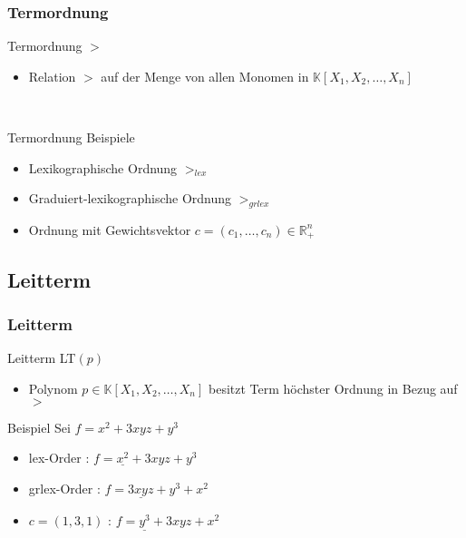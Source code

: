 \documentclass{beamer}
\begin{document}
\begin{frame}[<+->][fragile]
\frametitle{Termordnung}
\begin{block}{Termordnung $>$}
\begin{itemize}
\item Relation $>$ auf der Menge von allen Monomen in $ \mathbb{K} \left[X_{1},X_{2},\dots, X_{n}\right]  $ 
\end{itemize}

\end{block}

~\\

\begin{block}{Termordnung Beispiele }
\begin{itemize}
\item Lexikographische Ordnung $>_{lex}$
\item Graduiert-lexikographische Ordnung $>_{grlex}$
\item Ordnung mit Gewichtsvektor $c = (c_1, \ldots , c_n ) \in \mathbb{R}^{n}_{+}$
\end{itemize}



\end{block}


\end{frame}
\subsection{Leitterm}


\begin{frame}[<+->][fragile]
\frametitle{Leitterm}

\begin{block}{Leitterm \textsc{LT}$(p)$ }
\begin{itemize}
\item Polynom $p \in  \mathbb{K} \left[X_{1},X_{2},\dots, X_{n}\right] $  besitzt Term höchster Ordnung in Bezug auf $>$
\end{itemize}

\end{block}


\begin{block}{Beispiel}
Sei $f = x^{2}+3xyz+y^{3} $
\begin{itemize}

\item lex-Order : $f = \underline{x^{2}} + 3xyz + y^{3}  $
\item grlex-Order :  $f = \underline{3xyz} + y^{3} + x^{2}  $
\item $c = \left(1,3,1\right)$ :  $f = \underline{y^{3}} + 3xyz + x^{2}  $
\end{itemize}

\end{block}


\end{frame}
\end{document}
